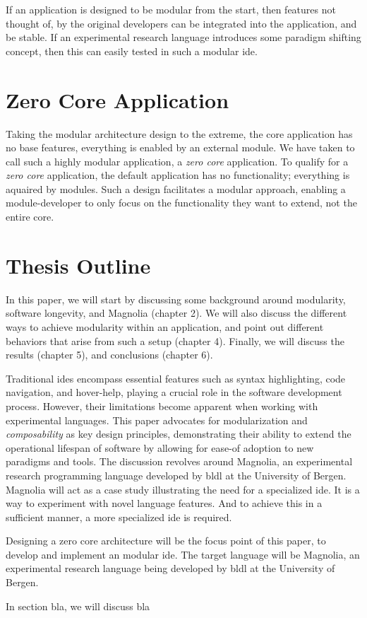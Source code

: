 If an application is designed to be modular from the start, then features not
thought of, by the original developers can be integrated into the application,
and be stable. If an experimental research language introduces some paradigm
shifting concept, then this can easily tested in such a modular \gls{ide}.

\section{Zero Core Application}

Taking the modular architecture design to the extreme, the core application has
no base features, everything is enabled by an external module. We have taken to
call such a highly modular application, a \textit{zero core} application. To
qualify for a \textit{zero core} application, the default application has no
functionality; everything is aquaired by modules. Such a design facilitates a
modular approach, enabling a module-developer to only focus on the functionality
they want to extend, not the entire core.

\section{Thesis Outline}

In this paper, we will start by discussing some background around modularity,
software longevity, and Magnolia (chapter 2). We will also discuss the different
ways to achieve modularity within an application, and point out different
behaviors that arise from such a setup (chapter 4). Finally, we will discuss the
results (chapter 5), and conclusions (chapter 6).

Traditional \gls{ide}s encompass essential features such as syntax highlighting, code
navigation, and hover-help, playing a crucial role in the software development
process. However, their limitations become apparent when working with
experimental languages. This paper advocates for modularization and
\textit{composability} as key design principles, demonstrating their ability to
extend the operational lifespan of software by allowing for ease-of adoption to
new paradigms and tools. The discussion revolves around Magnolia, an
experimental research programming language developed by \gls{bldl} at the
University of Bergen. Magnolia will act as a case study illustrating the need for
a specialized \gls{ide}. It is a way to experiment with novel language features.
And to achieve this in a sufficient manner, a more specialized \gls{ide} is
required.

Designing a zero core architecture will be the focus point of this paper, to
develop and implement an modular \gls{ide}. The target language will be Magnolia,
an experimental research language being developed by \gls{bldl} at the University
of Bergen.

In section bla, we will discuss bla
